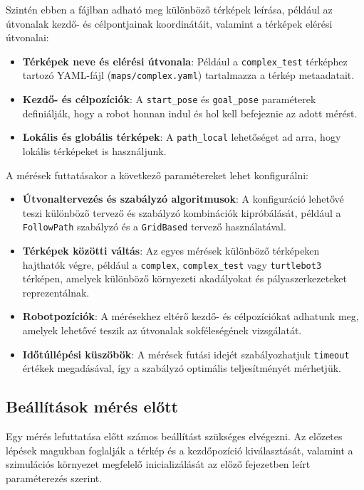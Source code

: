 Szintén ebben a fájlban adható meg különböző térképek leírása, például az útvonalak kezdő- és célpontjainak koordinátáit, valamint a térképek elérési útvonalai:
\begin{itemize}
    \item \textbf{Térképek neve és elérési útvonala}: Például a \texttt{complex\_test} térképhez tartozó YAML-fájl (\texttt{maps/complex.yaml}) tartalmazza a térkép metaadatait.
    \item \textbf{Kezdő- és célpozíciók}: A \texttt{start\_pose} és \texttt{goal\_pose} paraméterek definiálják, hogy a robot honnan indul és hol kell befejeznie az adott mérést.
    \item \textbf{Lokális és globális térképek}: A \texttt{path\_local} lehetőséget ad arra, hogy lokális térképeket is használjunk.
\end{itemize}

A mérések futtatásakor a következő paramétereket lehet konfigurálni:
\begin{itemize}
    \item \textbf{Útvonaltervezés és szabályzó algoritmusok}: A konfiguráció lehetővé teszi különböző tervező és szabályzó kombinációk kipróbálását, például a \texttt{FollowPath} szabályzó és a \texttt{GridBased} tervező használatával.
    \item \textbf{Térképek közötti váltás}: Az egyes mérések különböző térképeken hajthatók végre, például a \texttt{complex}, \texttt{complex\_test} vagy \texttt{turtlebot3} térképen, amelyek különböző környezeti akadályokat és pályaszerkezeteket reprezentálnak.
    \item \textbf{Robotpozíciók}: A mérésekhez eltérő kezdő- és célpozíciókat adhatunk meg, amelyek lehetővé teszik az útvonalak sokféleségének vizsgálatát.
    \item \textbf{Időtúllépési küszöbök}: A mérések futási idejét szabályozhatjuk \texttt{timeout} értékek megadásával, így a szabályzó optimális teljesítményét mérhetjük.
\end{itemize}

\subsection{Beállítások mérés előtt}
Egy mérés lefuttatása előtt számos beállítást szükséges elvégezni. Az előzetes lépések magukban foglalják a térkép és a kezdőpozíció kiválasztását, valamint a szimulációs környezet megfelelő inicializálását az előző fejezetben leírt paraméterezés szerint.

